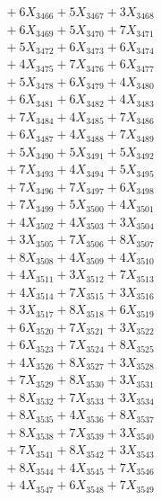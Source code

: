 \documentclass[a4paper,10pt]{article}
\begin{document}
{\begin{align}
&\;  + 6 X_{3466} + 5 X_{3467} + 3 X_{3468} \\[0.3ex]
&\;  + 6 X_{3469} + 5 X_{3470} + 7 X_{3471} \\[0.3ex]
&\;  + 5 X_{3472} + 6 X_{3473} + 6 X_{3474} \\[0.3ex]
&\;  + 4 X_{3475} + 7 X_{3476} + 6 X_{3477} \\[0.3ex]
&\;  + 5 X_{3478} + 6 X_{3479} + 4 X_{3480} \\[0.3ex]
&\;  + 6 X_{3481} + 6 X_{3482} + 4 X_{3483} \\[0.3ex]
&\;  + 7 X_{3484} + 4 X_{3485} + 7 X_{3486} \\[0.3ex]
&\;  + 6 X_{3487} + 4 X_{3488} + 7 X_{3489} \\[0.5ex]\allowbreak
&\;  + 5 X_{3490} + 5 X_{3491} + 5 X_{3492} \\[0.3ex]
&\;  + 7 X_{3493} + 4 X_{3494} + 5 X_{3495} \\[0.3ex]
&\;  + 7 X_{3496} + 7 X_{3497} + 6 X_{3498} \\[0.3ex]
&\;  + 7 X_{3499} + 5 X_{3500} + 4 X_{3501} \\[0.3ex]
&\;  + 4 X_{3502} + 4 X_{3503} + 3 X_{3504} \\[0.3ex]
&\;  + 3 X_{3505} + 7 X_{3506} + 8 X_{3507} \\[0.3ex]
&\;  + 8 X_{3508} + 4 X_{3509} + 4 X_{3510} \\[0.3ex]
&\;  + 4 X_{3511} + 3 X_{3512} + 7 X_{3513} \\[0.3ex]
&\;  + 4 X_{3514} + 7 X_{3515} + 3 X_{3516} \\[0.3ex]
&\;  + 3 X_{3517} + 8 X_{3518} + 6 X_{3519} \\[0.5ex]\allowbreak
&\;  + 6 X_{3520} + 7 X_{3521} + 3 X_{3522} \\[0.3ex]
&\;  + 6 X_{3523} + 7 X_{3524} + 8 X_{3525} \\[0.3ex]
&\;  + 4 X_{3526} + 8 X_{3527} + 3 X_{3528} \\[0.3ex]
&\;  + 7 X_{3529} + 8 X_{3530} + 3 X_{3531} \\[0.3ex]
&\;  + 8 X_{3532} + 7 X_{3533} + 3 X_{3534} \\[0.3ex]
&\;  + 8 X_{3535} + 4 X_{3536} + 8 X_{3537} \\[0.3ex]
&\;  + 8 X_{3538} + 7 X_{3539} + 3 X_{3540} \\[0.3ex]
&\;  + 7 X_{3541} + 8 X_{3542} + 3 X_{3543} \\[0.3ex]
&\;  + 8 X_{3544} + 4 X_{3545} + 7 X_{3546} \\[0.3ex]
&\;  + 4 X_{3547} + 6 X_{3548} + 7 X_{3549} \\[0.5ex]\allowbreak

\end{align}}
\end{document}
